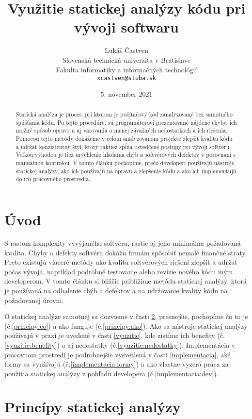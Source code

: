 \documentclass[11pt,twoside,slovak,a4paper]{article}
\title{Využitie statickej analýzy kódu pri vývoji softwaru}
\author{Lukáš Častven\\[2pt]
	{\small Slovenská technická univerzita v Bratislave}\\
	{\small Fakulta informatiky a informačných technológií}\\
	{\small \texttt{xcastven@stuba.sk}}
	}
\date{\small  5. november 2021}
\begin{document}
\maketitle

\begin{abstract}
	Statická analýza je proces, pri ktorom je počítačový kód zanalyzovaný bez samotného spúšťania kódu.
	Po tejto procedúre, sú programátorovi prezentované nájdené chyby, ich možný spôsob opravy a aj varovania
	o menej závažných nedostatkoch a ich riešenia. Pomocou tejto metódy dokážeme v celom analyzovanom projekte
	zlepšiť kvalitu kódu a udržať konzistentný štýl, ktorý taktiež spĺňa osvedčené postupy pri vývoji softvéru.
	Veľkou výhodou je tiež urýchlenie hľadania chýb a softvérových defektov v porovnaní s manuálnou kontrolou.
	V tomto článku pochopíme, prečo developeri používajú nástroje statickej analýzy, ako ich používajú
	na opravu a zlepšenie kódu a ako ich implementujú do ich pracovného prostredia.
\end{abstract}

\pagestyle{plain}

\section{Úvod}
S rastom komplexity vyvýjaného softvéru, rastie aj jeho minimálna požadovaná kvalita. Chyby a defekty softvéru
dokážu firmám spôsobiť nemalé finančné straty. Preto existujú viaceré metódy ako kvalitu softvérových riešení zlepšiť
a udržať počas vývoja, napríklad podrobné testovanie alebo revízie nového kódu iným developerom. V tomto článku si
bližšie priblížime metódu statickej analýzy, ktorá je používaná na odhalenie chýb a defektov a na udržovanie kvality kódu na požadovanej
úrovni.~\cite{BrittanyJohnson,LisaNguyen}

O statickej analýze samotnej sa dozvieme v časti \ref{principy}, presnejšie, pochopíme čo to je (č.\ref{principy:co}) a
ako funguje (č.\ref{principy:ako}). Ako sa nástroje statickej analýzy používajú v praxi je uvedené v časti \ref{vyuzitie}, kde
zistíme ich benefity (č.\ref{vyuzitie:benefity}) a aj nedostatky (č.\ref{vyuzitie:nedostatky}). Implementácia v pracovnom prostredí
je podrobnejšie vysvetlená v časti \ref{implementacia}, aké formy sa využívajú (č.\ref{implementacia:formy}) a ako vlastne vyzerá
práca za použitia statickej analýzy z pohľadu developera (č.\ref{implementacia:dev}).

\pagebreak

\section{Princípy statickej analýzy} \label{principy}
\end{document}
